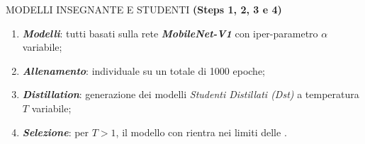 \begin{frame}{MODELLI INSEGNANTE E STUDENTI}
  {\bfseries{\scriptsize{(Steps 1, 2, 3 e 4)}}}
  \renewcommand{\thefootnote}{\fnsymbol{footnote}}
  \begin{minipage}{\linewidth}
    \centering
    \begin{minipage}{0.45\linewidth}
      \begin{enumerate}
        \item {\bfseries{\emph{Modelli}}}: tutti basati sulla rete {\bfseries{\emph{MobileNet-V1}}} con iper-parametro $\alpha$\footnotemark[1] variabile;
        \item {\bfseries{\emph{Allenamento}}}: individuale su un totale di 1000 epoche;
        \item {\bfseries{\emph{Distillation}}}: generazione dei modelli \emph{Studenti Distillati (Dst)} a temperatura $T$ variabile;
        \item {\bfseries{\emph{Selezione}}}: per $T>1$, il modello con {} rientra nei limiti delle \color{blue}{accuratezze}.
      \end{enumerate}
    \end{minipage}
    \hspace{0.3cm}
    \begin{minipage}{0.50\linewidth}
      \begin{center}
\end{center}
\end{minipage}
\end{minipage}
\end{frame}
